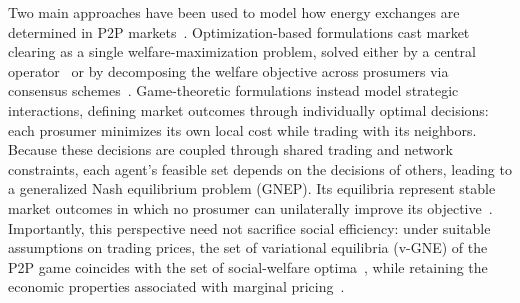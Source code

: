 \documentclass[final]{l4dc2026}
\begin{document}
Two main approaches have been used to model how energy exchanges are determined in P2P markets~\citep{sousa2019peer,tushar2018transforming,islam2024review}. Optimization-based formulations cast market clearing as a single welfare-maximization problem, solved either by a central operator~\citep{cadre_peer-peer_2020} or by decomposing the welfare objective across prosumers via consensus schemes~\citep{sorin2018consensus, baroche2019prosumer, moret2020loss}. Game-theoretic formulations instead model strategic interactions, defining market outcomes through individually optimal decisions: each prosumer minimizes its own local cost while trading with its neighbors. Because these decisions are coupled through shared trading and network constraints, each agent's feasible set depends on the decisions of others, leading to a generalized Nash equilibrium problem (GNEP). Its equilibria represent stable market outcomes in which no prosumer can unilaterally improve its objective~\citep{belgioioso2022operationally,behrunani2023designing,tushar2018transforming}. Importantly, this perspective need not sacrifice social efficiency: under suitable assumptions on trading prices, the set of variational equilibria (v-GNE) of the P2P game coincides with the set of social-welfare optima~\citep{cadre_peer-peer_2020}, while retaining the economic properties associated with marginal pricing~\citep{conejo2023marginal}.
\end{document}
